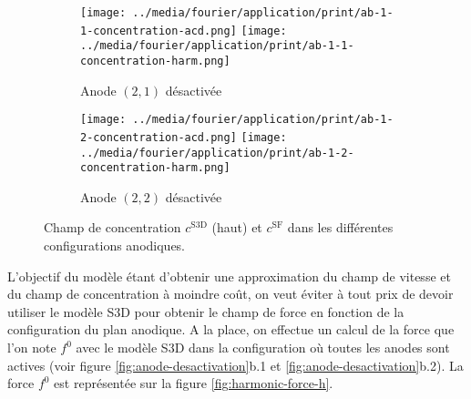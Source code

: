 \begin{figure}[h]
  \begin{center}
    \begin{subfigure}[t]{\textwidth}
      \begin{center}
        \texttt{[image: ../media/fourier/application/print/ab-1-1-concentration-acd.png]}
        \texttt{[image: ../media/fourier/application/print/ab-1-1-concentration-harm.png]}
        \caption{Anode $(2,1)$ désactivée}
        \label{fig:}
      \end{center}
    \end{subfigure}

    \begin{subfigure}[t]{\textwidth}
      \begin{center}
        \texttt{[image: ../media/fourier/application/print/ab-1-2-concentration-acd.png]}
        \texttt{[image: ../media/fourier/application/print/ab-1-2-concentration-harm.png]}
        \caption{Anode $(2,2)$ désactivée}
        \label{fig:}
      \end{center}
    \end{subfigure}


    \caption{Champ de concentration $c^\mathrm{S3D}$ (haut) et
      $c^\mathrm{SF}$ dans les différentes configurations anodiques.}

    \label{fig:harmonic-concentration-comp-b}
  \end{center}
\end{figure}

L'objectif du modèle étant d'obtenir une approximation du champ de
vitesse et du champ de concentration à moindre coût, on veut éviter à
tout prix de devoir utiliser le modèle S3D pour obtenir le champ de
force en fonction de la configuration du plan anodique. A la place, on
effectue un calcul de la force que l'on note $f^0$ avec le modèle S3D
dans la configuration où toutes les anodes sont actives (voir figure
\ref{fig:anode-desactivation}b.1 et
\ref{fig:anode-desactivation}b.2). La force $f^0$ est représentée sur
la figure \ref{fig:harmonic-force-h}.

